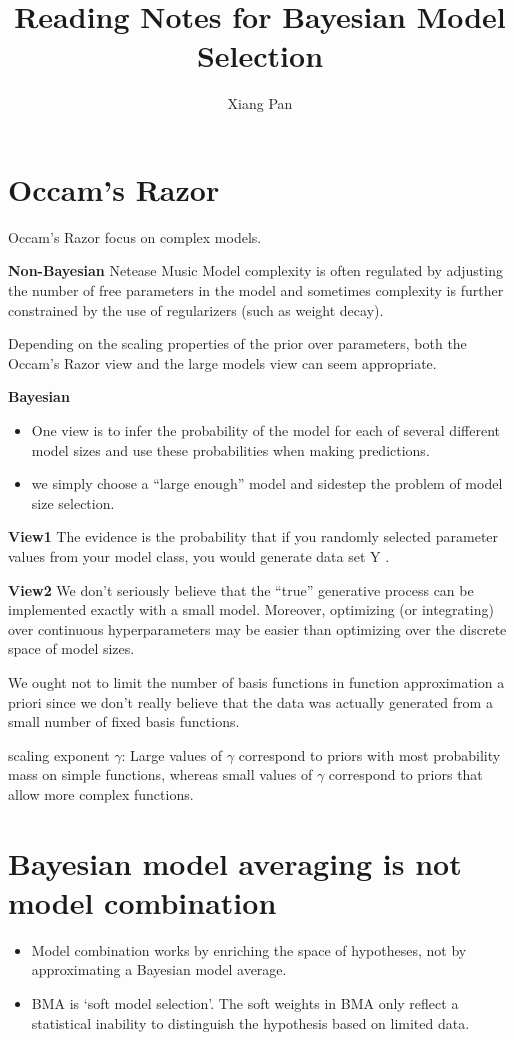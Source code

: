 \documentclass{article}
\title{Reading Notes for Bayesian Model Selection}
\author{Xiang Pan}
\begin{document}
\maketitle
\section{Occam’s Razor}

Occam’s Razor focus on complex models.

\textbf{Non-Bayesian} Netease Music
Model complexity is often regulated by adjusting the number of free parameters in the model and sometimes complexity is further constrained by the use of regularizers (such as weight decay).

Depending on the scaling properties of the prior over parameters, both the Occam’s Razor view and the large models view can seem appropriate.

\textbf{Bayesian}
\begin{itemize}
    \item One view is to infer the probability of the model for each of several different model sizes and use these probabilities when making predictions.
    \item we simply choose a “large enough” model and sidestep the problem of model size selection.
\end{itemize}

\textbf{View1}
The evidence is the probability that if you randomly selected parameter values from your model class, you would generate data set Y .

\textbf{View2}
We don’t seriously believe that the “true” generative process can be implemented exactly with a small model. Moreover, optimizing (or integrating) over continuous hyperparameters may be easier than optimizing over the discrete space of model sizes.

We ought not to limit the number of basis functions in function approximation a priori since we don’t really believe that the data was actually generated from a small number of ﬁxed basis functions.


scaling exponent $\gamma$: Large values of $\gamma$ correspond to priors with most probability mass on simple functions, whereas small values of $\gamma$ correspond to priors that allow more complex functions.



\section{Bayesian model averaging is not model combination}
\begin{itemize}
    \item Model combination works by enriching the space of hypotheses, not by approximating a Bayesian model average.
    \item BMA is ‘soft model selection’. The soft weights in BMA only reflect a statistical inability to distinguish the hypothesis based on limited data.
\end{itemize}
\end{document}
